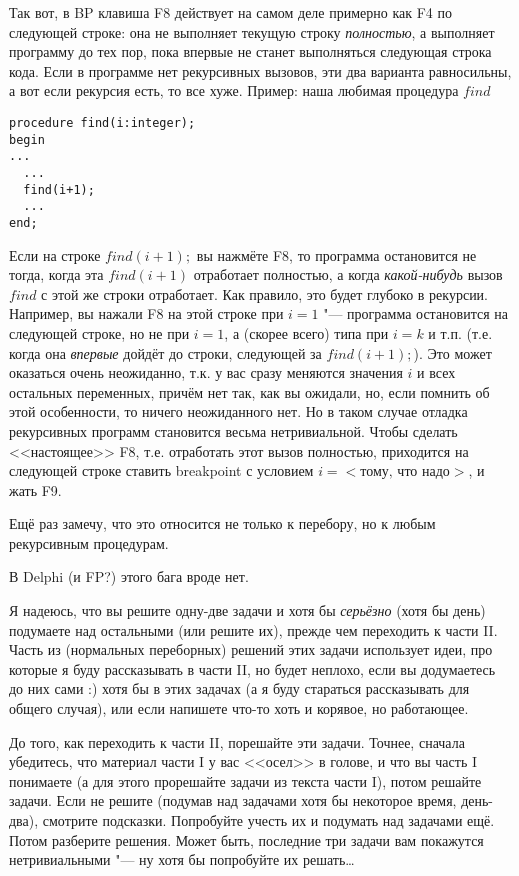 Так вот, в BP клавиша F8 действует на самом деле примерно как F4 по следующей 
строке: она не выполняет текущую строку \textit{полностью}, а выполняет программу до тех 
пор, пока впервые не станет выполняться следующая строка кода. Если в программе 
нет рекурсивных вызовов, эти два варианта равносильны, а вот если рекурсия есть, 
то все хуже. Пример: наша любимая процедура $find$
\begin{codesampleo}\begin{verbatim}
procedure find(i:integer);
begin
...
  ...
  find(i+1);
  ...
end;
\end{verbatim}\end{codesampleo}
Если на строке $find(i+1);$ вы нажмёте F8, то программа остановится не тогда, 
когда эта $find(i+1)$ отработает полностью, а когда \textit{какой-нибудь} вызов $find$ с 
этой же строки отработает. Как правило, это будет глубоко в рекурсии. Например, 
вы нажали F8 на этой строке при $i=1$ "--- программа остановится на следующей строке, но не 
при $i=1$, а (скорее всего) типа при $i=k$ и т.п. (т.е. когда она \textit{впервые} дойдёт до 
строки, следующей за $find(i+1);$). Это может оказаться очень  
неожиданно, т.к. у вас сразу меняются значения $i$ и всех остальных переменных, 
причём нет так, как вы ожидали, но, если помнить об этой особенности, то ничего 
неожиданного нет. Но в таком случае отладка рекурсивных программ становится 
весьма нетривиальной. Чтобы сделать <<настоящее>> F8, т.е. отработать этот вызов 
полностью, приходится на следующей строке ставить breakpoint с условием 
$i=<\mbox{тому, что надо}>$, и жать F9.

Ещё раз замечу, что это относится не только к перебору, но к любым рекурсивным 
процедурам.

В Delphi (и FP?) этого бага вроде нет.

Я надеюсь, что вы решите одну-две задачи и хотя бы \textit{серьёзно} (хотя бы день) 
подумаете над остальными (или решите их), прежде чем переходить к части II.
Часть из (нормальных переборных) решений этих задачи использует идеи, про которые я буду 
рассказывать в части II, но будет неплохо, если вы додумаетесь до них сами :) хотя бы в этих 
задачах (а я буду стараться рассказывать для общего случая), или если напишете что-то хоть и 
корявое, но работающее.

До того, как переходить к части II, порешайте эти задачи. Точнее, сначала убедитесь, что 
материал части I у вас <<осел>> в голове, и что вы часть I понимаете (а для этого прорешайте 
задачи из текста части I), потом решайте задачи. Если не решите (подумав над задачами хотя бы 
некоторое время, день-два), смотрите подсказки. Попробуйте учесть их и подумать 
над задачами ещё. Потом разберите решения. Может быть, последние три задачи вам 
покажутся нетривиальными "--- ну хотя бы попробуйте их решать\dots

